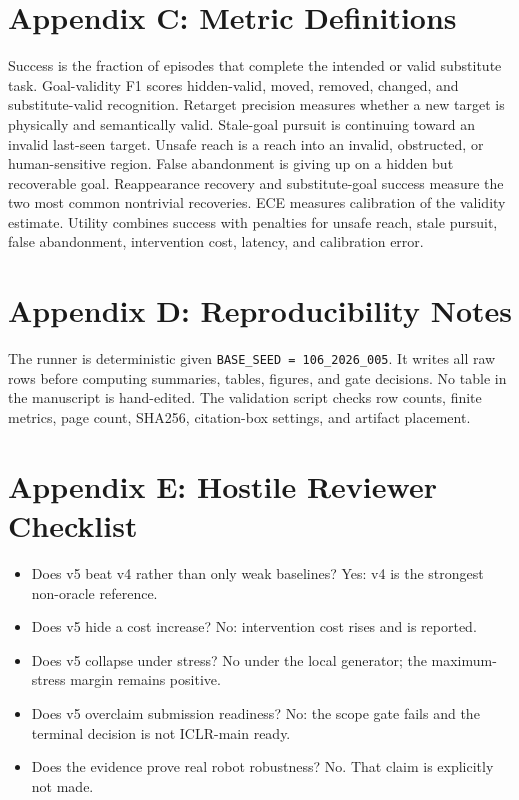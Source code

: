 \documentclass{article}
\begin{document}
\section{Appendix C: Metric Definitions}
Success is the fraction of episodes that complete the intended or valid substitute task. Goal-validity F1 scores hidden-valid, moved, removed, changed, and substitute-valid recognition. Retarget precision measures whether a new target is physically and semantically valid. Stale-goal pursuit is continuing toward an invalid last-seen target. Unsafe reach is a reach into an invalid, obstructed, or human-sensitive region. False abandonment is giving up on a hidden but recoverable goal. Reappearance recovery and substitute-goal success measure the two most common nontrivial recoveries. ECE measures calibration of the validity estimate. Utility combines success with penalties for unsafe reach, stale pursuit, false abandonment, intervention cost, latency, and calibration error.

\section{Appendix D: Reproducibility Notes}
The runner is deterministic given \texttt{BASE\_SEED = 106\_2026\_005}. It writes all raw rows before computing summaries, tables, figures, and gate decisions. No table in the manuscript is hand-edited. The validation script checks row counts, finite metrics, page count, SHA256, citation-box settings, and artifact placement.

\section{Appendix E: Hostile Reviewer Checklist}
\begin{itemize}
\item Does v5 beat v4 rather than only weak baselines? Yes: v4 is the strongest non-oracle reference.
\item Does v5 hide a cost increase? No: intervention cost rises and is reported.
\item Does v5 collapse under stress? No under the local generator; the maximum-stress margin remains positive.
\item Does v5 overclaim submission readiness? No: the scope gate fails and the terminal decision is not ICLR-main ready.
\item Does the evidence prove real robot robustness? No. That claim is explicitly not made.
\end{itemize}
\end{document}

